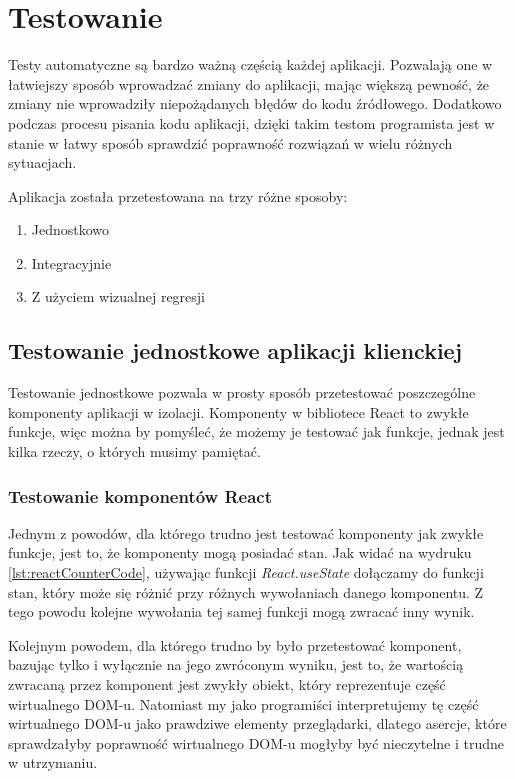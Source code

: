 \newpage
\section{Testowanie}
Testy automatyczne są bardzo ważną częścią każdej aplikacji. Pozwalają one w łatwiejszy sposób wprowadzać zmiany do aplikacji, mając większą pewność, że zmiany nie wprowadziły niepożądanych błędów do kodu źródłowego. Dodatkowo podczas procesu pisania kodu aplikacji, dzięki takim testom programista jest w stanie w łatwy sposób sprawdzić poprawność rozwiązań w wielu różnych sytuacjach.

Aplikacja została przetestowana na trzy różne sposoby:
\begin{enumerate}
  \item Jednostkowo
  \item Integracyjnie
  \item Z użyciem wizualnej regresji
\end{enumerate}

\subsection{Testowanie jednostkowe aplikacji klienckiej}
Testowanie jednostkowe pozwala w prosty sposób przetestować poszczególne komponenty aplikacji w izolacji. Komponenty w bibliotece React to zwykłe funkcje, więc można by pomyśleć, że możemy je testować jak funkcje, jednak jest kilka rzeczy, o których musimy pamiętać.

\subsubsection{Testowanie komponentów React}
Jednym z powodów, dla którego trudno jest testować komponenty jak zwykłe funkcje, jest to, że komponenty mogą posiadać stan. Jak widać na wydruku \ref{lst:reactCounterCode}, używając funkcji \emph{React.useState} dołączamy do funkcji stan, który może się różnić przy różnych wywołaniach danego komponentu. Z tego powodu kolejne wywołania tej samej funkcji mogą zwracać inny wynik.

Kolejnym powodem, dla którego trudno by było przetestować komponent, bazując tylko i wyłącznie na jego zwróconym wyniku, jest to, że wartością zwracaną przez komponent jest zwykły obiekt, który reprezentuje część wirtualnego DOM-u. Natomiast my jako programiści interpretujemy tę część wirtualnego DOM-u jako prawdziwe elementy przeglądarki, dlatego asercje, które sprawdzałyby poprawność wirtualnego DOM-u mogłyby być nieczytelne i trudne w utrzymaniu.

